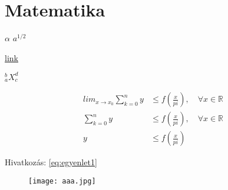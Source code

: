 \section{Matematika}
	$\alpha$
	$a^{1/2}$
	
	\href{http://google.hu}{link}
	
	$_a^bX_c^d$
	
	\begin{align}
		lim_{x \rightarrow x_0} \sum_{k=0}^{n} y &\leq f \left( \frac{x}{pi} \right), \quad \forall x \in \mathbb{R}
		\\
		\sum_{k=0}^{n} y &\leq f \left( \frac{x}{pi} \right), \quad \forall x \in \mathbb{R} \nonumber
		\\
		y &\leq f \left( \frac{x}{pi} \right)
		\label{eq:egyenlet1}
	\end{align}
	
	Hivatkozás: \ref{eq:egyenlet1}
	
	\begin{figure}[h!]
		\centering
		\texttt{[image: aaa.jpg]}
		\label{kep:kep1}
	\end{figure}